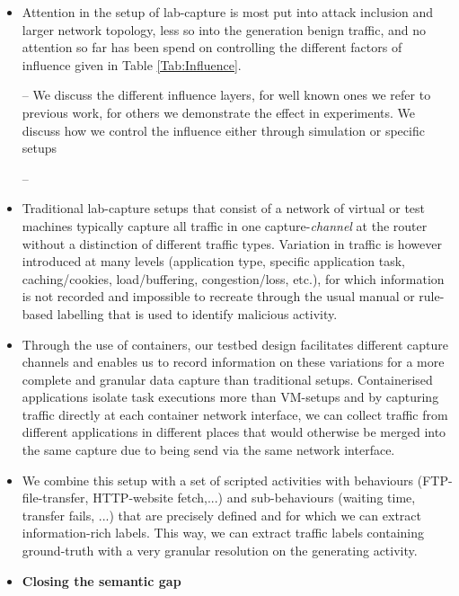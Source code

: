 \documentclass{article}
\begin{document}
\begin{itemize}


\item Attention in the setup of lab-capture is most put into attack inclusion and larger network topology, less so into the generation benign traffic, and no attention so far has been spend on controlling the different factors of influence given in Table \ref{Tab:Influence}.

\item[--] We discuss the different influence layers, for well known ones we refer to previous work, for others we demonstrate the effect in experiments. We discuss how we control the influence either through simulation or specific setups

\item[--]

\item Traditional lab-capture setups that consist of a network of virtual or test machines typically capture all traffic in one capture-\textit{channel} at the router without a distinction of different traffic types. Variation in traffic is however introduced at many levels (application type, specific application task, caching/cookies, load/buffering, congestion/loss, etc.), for which information is not  recorded and impossible to recreate through the usual manual or rule-based labelling that is used to identify malicious activity.

\item Through the use of containers, our testbed design facilitates different capture channels and enables us to record  information on these variations for a more complete and granular data capture than traditional setups. Containerised applications isolate task executions more than VM-setups and by capturing traffic directly at each container network interface, we can collect traffic from different applications in different places that would otherwise be merged into the same capture due to being send via the same network interface.

\item We combine this setup with a set of scripted activities with behaviours (FTP-file-transfer, HTTP-website fetch,...) and sub-behaviours (waiting time, transfer fails, ...) that are precisely defined and for which we can extract information-rich labels. This way, we can extract traffic labels containing ground-truth with a very granular resolution on the generating activity.

\item \textbf{Closing the semantic gap}
\begin{itemize}


\end{itemize}
\end{itemize}
\end{document}
